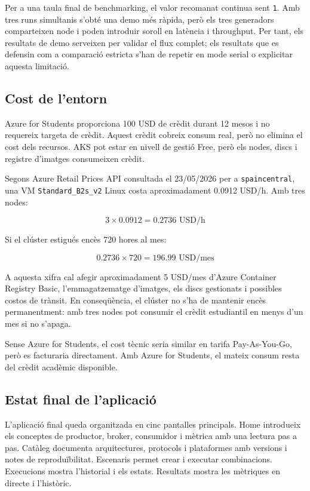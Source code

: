 Per a una taula final de benchmarking, el valor recomanat continua sent
\texttt{1}. Amb tres runs simultanis s'obté una demo més ràpida, però els tres
generadors comparteixen node i poden introduir soroll en latència i throughput.
Per tant, els resultats de demo serveixen per validar el flux complet; els
resultats que es defensin com a comparació estricta s'han de repetir en mode
serial o explicitar aquesta limitació.

\subsection{Cost de l'entorn}

Azure for Students proporciona 100 USD de crèdit durant 12 mesos i no requereix
targeta de crèdit. Aquest crèdit cobreix consum real, però no elimina el cost
dels recursos. AKS pot estar en nivell de gestió Free, però els nodes, discs i
registre d'imatges consumeixen crèdit.

Segons Azure Retail Prices API consultada el 23/05/2026 per a
\texttt{spaincentral}, una VM \texttt{Standard\_B2s\_v2} Linux costa
aproximadament 0.0912 USD/h. Amb tres nodes:

\[
3 \times 0.0912 = 0.2736 \text{ USD/h}
\]

Si el clúster estigués encès 720 hores al mes:

\[
0.2736 \times 720 = 196.99 \text{ USD/mes}
\]

A aquesta xifra cal afegir aproximadament 5 USD/mes d'Azure Container Registry
Basic, l'emmagatzematge d'imatges, els discs gestionats i possibles costos de
trànsit. En conseqüència, el clúster no s'ha de mantenir encès permanentment:
amb tres nodes pot consumir el crèdit estudiantil en menys d'un mes si no
s'apaga.

Sense Azure for Students, el cost tècnic seria similar en tarifa Pay-As-You-Go,
però es facturaria directament. Amb Azure for Students, el mateix consum resta
del crèdit acadèmic disponible.

\subsection{Estat final de l'aplicació}

L'aplicació final queda organitzada en cinc pantalles principals. Home introdueix
els conceptes de productor, broker, consumidor i mètrica amb una lectura pas a
pas. Catàleg documenta arquitectures, protocols i plataformes amb versions i
notes de reproduïbilitat. Escenaris permet crear i executar combinacions.
Execucions mostra l'historial i els estats. Resultats mostra les mètriques en
directe i l'històric.

